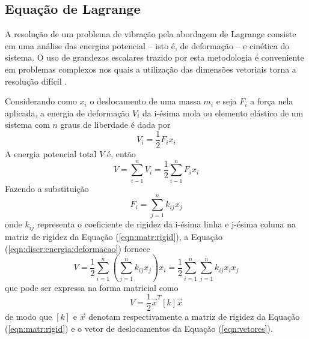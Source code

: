 \documentclass[12pt,openright,oneside,a4paper,
	chapter=TITLE,section=TITLE,
	english,brazil]{abntex2}
\begin{document}
	\subsection{Equação de Lagrange}
	A resolução de um problema de vibração pela abordagem de Lagrange consiste em uma análise das energias potencial -- isto é, de deformação -- e cinética do sistema. O uso de grandezas escalares trazido por esta metodologia é conveniente em problemas complexos nos quais a utilização das dimensões vetoriais torna a resolução difícil \cite{savi:2017}.
	
	Considerando como $x_i$ o deslocamento de uma massa $m_i$ e seja $F_i$ a força nela aplicada, a energia de deformação $V_i$ da i-ésima mola ou elemento elástico de um sistema com $n$ graus de liberdade é dada por \cite{rao:2008}
	\begin{equation}
		V_i = \frac{1}{2}F_i x_i
	\end{equation}
	A energia potencial total $V$ é, então
	\begin{equation} \label{eqn:discr:energia:deformacao}
		V = \sum_{i-1}^{n}V_i = \frac{1}{2}\sum_{i-1}^{n}F_i x_i
	\end{equation}
	Fazendo a substituição
	\begin{equation}
		F_i = \sum_{j=1}^{n}k_{ij} x_j
	\end{equation}
	onde $k_{ij}$ representa o coeficiente de rigidez da i-ésima linha e j-ésima coluna na matriz de rigidez da Equação (\ref{eqn:matr:rigid}), a Equação (\ref{eqn:discr:energia:deformacao}) fornece
	\begin{equation}
		V = \frac{1}{2}\sum_{i=1}^{n}\left(\sum_{j=1}^{n}k_{ij} x_j\right)x_i = \frac{1}{2}\sum_{i=1}^{n}\sum_{j=1}^{n}k_{ij} x_i x_j
	\end{equation}
	que pode ser expressa na forma matricial como
	\begin{equation}
		V = \frac{1}{2}\vec{x}^T [k] \vec{x}
	\end{equation}
	de modo que $[k]$ e $\vec{x}$ denotam respectivamente a matriz de rigidez da Equação (\ref{eqn:matr:rigid}) e o vetor de deslocamentos da Equação (\ref{eqn:vetores}).
	
\end{document}
